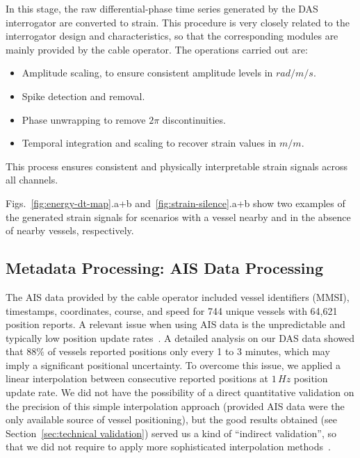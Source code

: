 \documentclass[11pt]{article}
\begin{document}
In this stage, the raw differential-phase time series generated by the DAS interrogator are converted to strain. This procedure is very closely related to the interrogator design and characteristics, so that the corresponding modules are mainly provided by the cable operator. The operations carried out are:

\begin{itemize}
  \item Amplitude scaling, to ensure consistent amplitude levels in $rad/m/s$.
  \item Spike detection and removal.
  \item Phase unwrapping to remove $2\pi$ discontinuities.
  \item Temporal integration and scaling to recover strain values in $m/m$.
\end{itemize}

This process ensures consistent and physically interpretable strain signals across all channels.

Figs.~\ref{fig:energy-dt-map}.a+b and~\ref{fig:strain-silence}.a+b show two examples of the generated strain signals for scenarios with a vessel nearby and in the absence of nearby vessels, respectively.



\subsection{Metadata Processing: AIS Data Processing}
\label{sec:ais-data-processing}

The AIS data provided by the cable operator included vessel identifiers (MMSI), timestamps, coordinates, course, and speed for 744 unique vessels with 64,621 position reports. A relevant issue when using AIS data is the unpredictable and typically low position update rates~\cite{emmens2021promisesAIS}. A detailed analysis on our DAS data showed that $88\%$ of vessels reported positions only every 1 to 3 minutes, which may imply a significant positional uncertainty. To overcome this issue, we applied a linear interpolation between consecutive reported positions at $1\,Hz$ position update rate. We did not have the possibility of a direct quantitative validation on the precision of this simple interpolation approach (provided AIS data were the only available source of vessel positioning), but the good results obtained (see Section~\ref{sec:technical validation}) served us a kind of ``indirect validation'', so that we did not require to apply more sophisticated interpolation methods~\cite{guo2021improved}.
\end{document}
